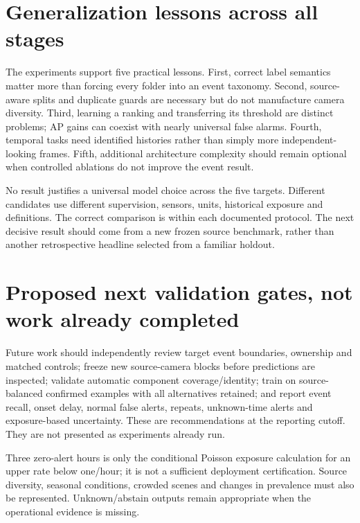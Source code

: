 \section{Generalization lessons across all stages}
The experiments support five practical lessons. First, correct label semantics matter more than forcing every folder into an event taxonomy. Second, source-aware splits and duplicate guards are necessary but do not manufacture camera diversity. Third, learning a ranking and transferring its threshold are distinct problems; AP gains can coexist with nearly universal false alarms. Fourth, temporal tasks need identified histories rather than simply more independent-looking frames. Fifth, additional architecture complexity should remain optional when controlled ablations do not improve the event result.

No result justifies a universal model choice across the five targets. Different candidates use different supervision, sensors, units, historical exposure and definitions. The correct comparison is within each documented protocol. The next decisive result should come from a new frozen source benchmark, rather than another retrospective headline selected from a familiar holdout.

\section{Proposed next validation gates, not work already completed}
Future work should independently review target event boundaries, ownership and matched controls; freeze new source-camera blocks before predictions are inspected; validate automatic component coverage/identity; train on source-balanced confirmed examples with all alternatives retained; and report event recall, onset delay, normal false alerts, repeats, unknown-time alerts and exposure-based uncertainty. These are recommendations at the reporting cutoff. They are not presented as experiments already run.

Three zero-alert hours is only the conditional Poisson exposure calculation for an upper rate below one/hour; it is not a sufficient deployment certification. Source diversity, seasonal conditions, crowded scenes and changes in prevalence must also be represented. Unknown/abstain outputs remain appropriate when the operational evidence is missing.
